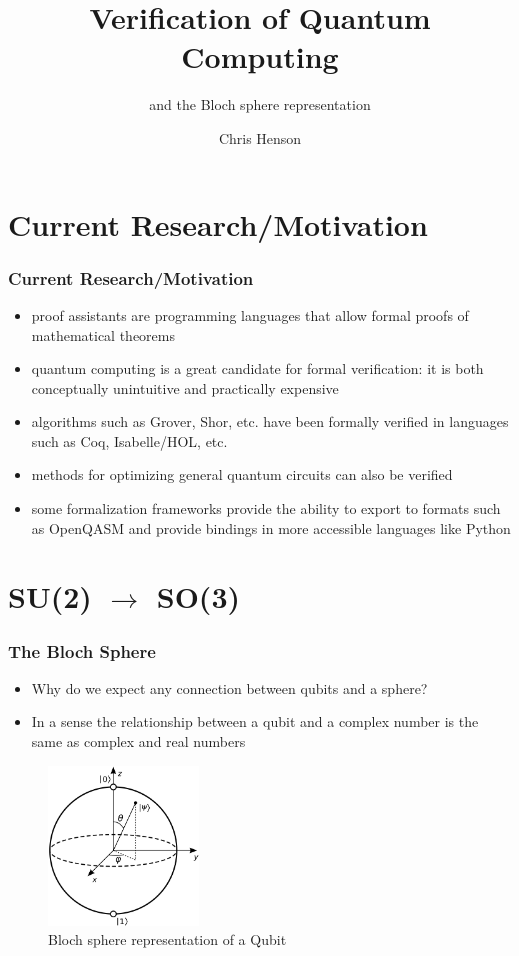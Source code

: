\documentclass{beamer}
\title{Verification of Quantum Computing}
\subtitle{and the Bloch sphere representation}
\author{Chris Henson}
\institute{Drexel University}
\begin{document}
\frame{\titlepage}

\section{Current Research/Motivation}
\begin{frame}
\frametitle{Current Research/Motivation}
\begin{itemize}
 \item proof assistants are programming languages that allow formal proofs of mathematical theorems
 \item quantum computing is a great candidate for formal verification: it is both conceptually unintuitive and practically expensive
 \item algorithms such as Grover, Shor, etc. have been formally verified in languages such as Coq, Isabelle/HOL, etc.
 \item methods for optimizing general quantum circuits can also be verified
 \item some formalization frameworks provide the ability to export to formats such as OpenQASM and provide bindings in more accessible languages like Python
\end{itemize}
\end{frame}

\section{SU(2) $\to$ SO(3)}

\begin{frame}
\frametitle{The Bloch Sphere}
\begin{itemize}
 \item Why do we expect any connection between qubits and a sphere?
 \item In a sense the relationship between a qubit and a complex number
	 		 is the same as complex and real numbers
\end{itemize}

\begin{figure}
		\includegraphics[width=4cm]{Bloch_sphere}
    \caption{Bloch sphere representation of a Qubit}
\end{figure}

\end{frame}
\end{document}
